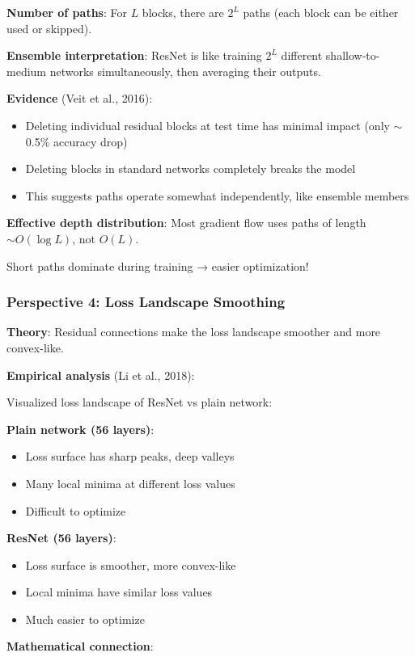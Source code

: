 \documentclass[11pt,oneside]{book}
\begin{document}
\textbf{Number of paths}: For $L$ blocks, there are $2^L$ paths (each block can be either used or skipped).

\textbf{Ensemble interpretation}: ResNet is like training $2^L$ different shallow-to-medium networks simultaneously, then averaging their outputs.

\textbf{Evidence} (Veit et al., 2016):
\begin{itemize}
\item Deleting individual residual blocks at test time has minimal impact (only $\sim$0.5\% accuracy drop)
\item Deleting blocks in standard networks completely breaks the model
\item This suggests paths operate somewhat independently, like ensemble members
\end{itemize}

\textbf{Effective depth distribution}: Most gradient flow uses paths of length $\sim O(\log L)$, not $O(L)$.

Short paths dominate during training → easier optimization!

\subsubsection{Perspective 4: Loss Landscape Smoothing}

\textbf{Theory}: Residual connections make the loss landscape smoother and more convex-like.

\textbf{Empirical analysis} (Li et al., 2018):

Visualized loss landscape of ResNet vs plain network:

\textbf{Plain network (56 layers)}:
\begin{itemize}
\item Loss surface has sharp peaks, deep valleys
\item Many local minima at different loss values
\item Difficult to optimize
\end{itemize}

\textbf{ResNet (56 layers)}:
\begin{itemize}
\item Loss surface is smoother, more convex-like
\item Local minima have similar loss values
\item Much easier to optimize
\end{itemize}

\textbf{Mathematical connection}:
\end{document}
